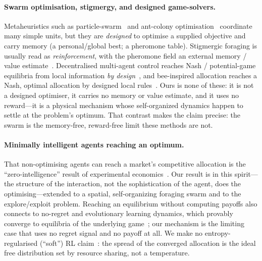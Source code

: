 \documentclass{article}
\begin{document}
\paragraph{Swarm optimisation, stigmergy, and designed game-solvers.} Metaheuristics such as
particle-swarm~\citep{kennedy1995particle} and ant-colony optimisation~\citep{dorigo1996ant} coordinate many
simple units, but they are \emph{designed} to optimise a supplied objective and carry memory (a personal/global
best; a pheromone table). Stigmergic foraging is usually read as \emph{reinforcement}, with the pheromone field
an external memory / value estimate~\citep{vellinger2025pheromones}. Decentralised multi-agent control reaches
Nash / potential-game equilibria from local information \emph{by design}~\citep{marden2009cooperative}, and
bee-inspired allocation reaches a Nash, optimal allocation by designed local rules~\citep{quijano2010honeybee}.
Ours is none of these: it is not a designed optimiser, it carries no memory or value estimate, and it uses no
reward---it is a physical mechanism whose self-organized dynamics happen to settle at the problem's optimum.
That contrast makes the claim precise: the swarm is the memory-free, reward-free limit these methods are not.

\paragraph{Minimally intelligent agents reaching an optimum.} That non-optimising agents can reach a market's
competitive allocation is the ``zero-intelligence'' result of experimental economics~\citep{gode1993allocative}.
Our result is in this spirit---the structure of the interaction, not the sophistication of the agent, does the
optimising---extended to a spatial, self-organizing foraging swarm and to the explore/exploit problem.
Reaching an equilibrium without computing payoffs also connects to no-regret and evolutionary learning
dynamics, which provably converge to equilibria of the underlying
game~\citep{sandholm2010population,hofbauer1998evolutionary}; our mechanism is the limiting case that uses no
regret signal and no payoff at all.
We make no entropy-regularised (``soft'') RL claim~\citep{haarnoja2018soft,ziebart2008maxent}: the spread of
the converged allocation is the ideal free distribution set by resource sharing, not a temperature.

\end{document}
